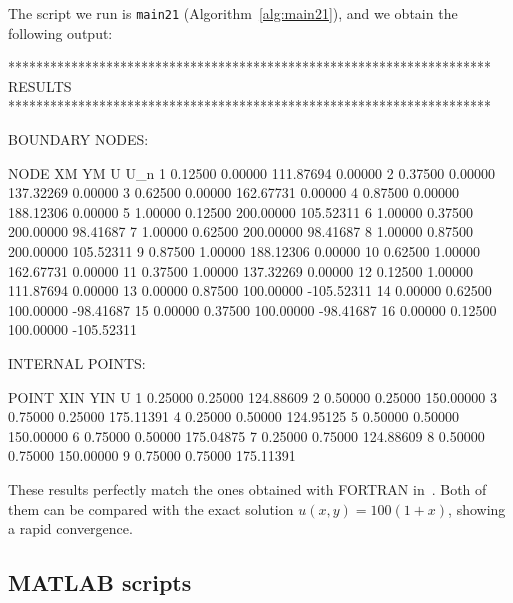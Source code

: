 The script we run is \texttt{main21} (Algorithm~\ref{alg:main21}), and we obtain the following output:
\begin{matlaboutput}
*********************************************************************
RESULTS
*********************************************************************

BOUNDARY NODES:

NODE        XM            YM            U             U_n
 1        0.12500       0.00000     111.87694       0.00000
 2        0.37500       0.00000     137.32269       0.00000
 3        0.62500       0.00000     162.67731       0.00000
 4        0.87500       0.00000     188.12306       0.00000
 5        1.00000       0.12500     200.00000     105.52311
 6        1.00000       0.37500     200.00000      98.41687
 7        1.00000       0.62500     200.00000      98.41687
 8        1.00000       0.87500     200.00000     105.52311
 9        0.87500       1.00000     188.12306       0.00000
 10       0.62500       1.00000     162.67731       0.00000
 11       0.37500       1.00000     137.32269       0.00000
 12       0.12500       1.00000     111.87694       0.00000
 13       0.00000       0.87500     100.00000    -105.52311
 14       0.00000       0.62500     100.00000     -98.41687
 15       0.00000       0.37500     100.00000     -98.41687
 16       0.00000       0.12500     100.00000    -105.52311

INTERNAL POINTS:

POINT        XIN           YIN           U
  1        0.25000       0.25000     124.88609
  2        0.50000       0.25000     150.00000
  3        0.75000       0.25000     175.11391
  4        0.25000       0.50000     124.95125
  5        0.50000       0.50000     150.00000
  6        0.75000       0.50000     175.04875
  7        0.25000       0.75000     124.88609
  8        0.50000       0.75000     150.00000
  9        0.75000       0.75000     175.11391
\end{matlaboutput}

These results perfectly match the ones obtained with FORTRAN in~\cite{sbemKatsi}. Both of them can be compared with the exact solution $u(x,y)=100(1+x)$, showing a rapid convergence.

\newpage 

\subsection{MATLAB scripts}
\label{sub:matlab_scripts2}%

